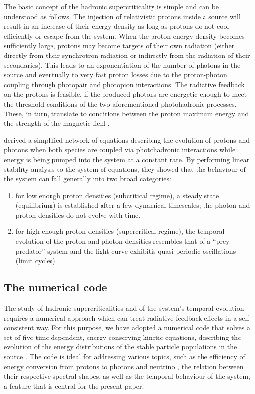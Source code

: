 \documentclass[fleqn,usenatbib]{mnras}
\begin{document}
{The basic concept of the hadronic supercriticality is simple and 
can be understood as follows. 
The injection of relativistic protons inside a source will 
result in an increase of their energy density as long as protons do not cool efficiently or escape from the system. When the proton energy density becomes sufficiently large, protons may become targets of their own radiation (either directly from their synchrotron radiation or indirectly from the radiation of their secondaries). This leads to an exponentiation of the number of photons in the source and eventually to very fast proton losses due to the proton-photon coupling through photopair and photopion interactions.  The radiative feedback on the protons is feasible, if the produced   photons are energetic enough to meet the
threshold conditions of the two aforementioned photohadronic processes. These, in turn, translate to conditions between  
the proton maximum energy and the strength of the magnetic field \citep{kirkmast92}.
 
\cite{petromast12b} derived a simplified network of equations describing the evolution of protons and photons when both species are coupled via photohadronic interactions while energy is  being pumped into the system at a constant rate.  By performing linear stability analysis to the system of equations, they showed that the behaviour of the system  can  fall generally  into two broad categories: 
\begin{enumerate}
 \item for low enough proton densities (subcritical regime), a steady state (equilibrium) is established after a few 
 dynamical timescales; the photon and proton densities do not evolve with time.
 \item for high enough proton densities (supercritical regime), the temporal evolution of the proton and photon densities resembles that of a  ``prey-predator'' system and the light curve exhibitis quasi-periodic oscillations (limit cycles).
\end{enumerate}

\subsection{The numerical code}
The study of hadronic supercriticalities and of the system's temporal evolution requires
a numerical approach which can treat radiative feedback effects in a self-consistent way. For this purpose, 
we have adopted a numerical code that solves a set of five time-dependent, energy-conserving kinetic equations, describing the evolution of the energy
distributions of the stable particle populations in the source \citep{dmpr12}. The code is ideal for addressing various topics, such as the efficiency of energy conversion from protons to photons and neutrino \citep[see also][]{pgd14, pdmg14, petro15}, the relation between their respective spectral shapes, as well as the temporal behaviour of the system, a feature that is central for the present paper.

}
\end{document}
